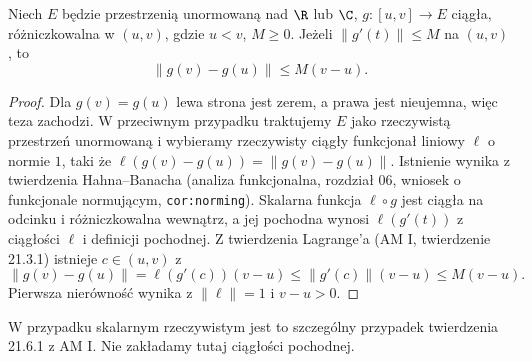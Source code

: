 \begin{lemat}
\label{ma2:lem:vector-increment}
Niech $E$ będzie przestrzenią unormowaną nad
$\R$ lub $\C$, $g:[u,v]\to E$ ciągła,
różniczkowalna w $(u,v)$, gdzie $u<v$, $M\ge0$.
Jeżeli $\|g'(t)\|\le M$ na $(u,v)$, to
\[
 \|g(v)-g(u)\|\le M(v-u).
\]
\end{lemat}
\begin{proof}
Dla $g(v)=g(u)$ lewa strona jest zerem,
a prawa jest nieujemna, więc teza zachodzi.
W przeciwnym przypadku traktujemy $E$ jako
rzeczywistą przestrzeń unormowaną i wybieramy
rzeczywisty ciągły funkcjonał liniowy $\ell$
o normie $1$, taki że
$\ell(g(v)-g(u))=\|g(v)-g(u)\|$.
Istnienie wynika z twierdzenia Hahna--Banacha
(analiza funkcjonalna, rozdział 06, wniosek
o funkcjonale normującym, \texttt{cor:norming}).
Skalarna funkcja $\ell\circ g$ jest ciągła
na odcinku i różniczkowalna wewnątrz, a jej
pochodna wynosi $\ell(g'(t))$ z ciągłości
$\ell$ i definicji pochodnej.
Z twierdzenia Lagrange'a (AM I, twierdzenie 21.3.1)
istnieje $c\in(u,v)$ z
\[
 \|g(v)-g(u)\|=\ell(g'(c))(v-u)
 \le\|g'(c)\|(v-u)\le M(v-u).
\]
Pierwsza nierówność wynika z $\|\ell\|=1$
i $v-u>0$.
\end{proof}
W przypadku skalarnym rzeczywistym jest to
szczególny przypadek twierdzenia 21.6.1 z AM I.
Nie zakładamy tutaj ciągłości pochodnej.

